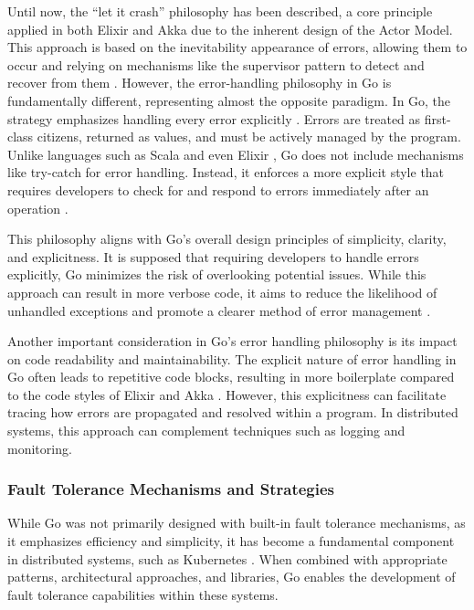 Until now, the “let it crash” philosophy has been described, a core principle applied in both Elixir and Akka due to the inherent design of the Actor Model. This approach is based on the inevitability appearance of errors, allowing them to occur and relying on mechanisms like the supervisor pattern to detect and recover from them \cite{Armstrong2013}. However, the error-handling philosophy in Go is fundamentally different, representing almost the opposite paradigm. In Go, the strategy emphasizes handling every error explicitly \cite{Kennedy2016,go-docs}. Errors are treated as first-class citizens, returned as values, and must be actively managed by the program. Unlike languages such as Scala and even Elixir \cite{elixir-docs-hexdocs}, Go does not include mechanisms like try-catch for error handling. Instead, it enforces a more explicit style that requires developers to check for and respond to errors immediately after an operation \cite{Cox-Buday2017}.

This philosophy aligns with Go’s overall design principles of simplicity, clarity, and explicitness. It is supposed that requiring developers to handle errors explicitly, Go minimizes the risk of overlooking potential issues. While this approach can result in more verbose code, it aims to reduce the likelihood of unhandled exceptions and promote a clearer method of error management \cite{Kennedy2016, go-docs}.

Another important consideration in Go’s error handling philosophy is its impact on code readability and maintainability. The explicit nature of error handling in Go often leads to repetitive code blocks, resulting in more boilerplate compared to the code styles of Elixir and Akka \cite{Kennedy2016, go-docs}. However, this explicitness can facilitate tracing how errors are propagated and resolved within a program. In distributed systems, this approach can complement techniques such as logging and monitoring.

\subsubsection{Fault Tolerance Mechanisms and Strategies}

While Go was not primarily designed with built-in fault tolerance mechanisms, as it emphasizes efficiency and simplicity, it has become a fundamental component in distributed systems, such as Kubernetes \cite{Castro2019, Kennedy2016}. When combined with appropriate patterns, architectural approaches, and libraries, Go enables the development of fault tolerance capabilities within these systems.

